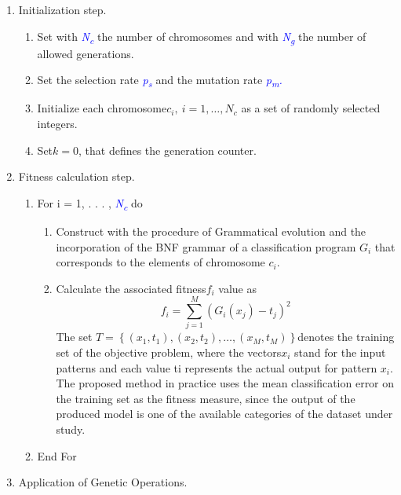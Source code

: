 \documentclass[12pt]{Definitions/academia}
\begin{document}
\begin{enumerate}
\item Initialization step.
\begin{enumerate}
\item Set with \textit{\textcolor{blue}{N\textsubscript{c}}} the number
of chromosomes and with \textit{\textcolor{blue}{N\textsubscript{g}}}
the number of allowed generations.
\item Set the selection rate \textit{\textcolor{blue}{p\textsubscript{s}
}}and the mutation rate \textit{\textcolor{blue}{p\textsubscript{m}.}}
\item Initialize each chromosome$c_{i},\ i=1,\ldots,N_{c}$ as a set of
randomly selected integers.
\item Set$k=0$, that defines the generation counter.
\end{enumerate}
\vspace{2em}
\item Fitness calculation step.
\begin{enumerate}
\item For i = 1, . . . , \textit{\textcolor{blue}{N\textsubscript{c}}}
do
\vspace{2em}
\begin{enumerate}
\item Construct with the procedure of Grammatical evolution and the incorporation
of the BNF grammar of  a classification
program $G_{i}$ that corresponds to the elements of chromosome $c_{i}$.
\item Calculate the associated fitness$f_{i}$ value as
\begin{equation}
f_{i}=\sum_{j=1}^{M}\left(G_{i}\left(x_{j}\right)-t_{j}\right)^{2}
\end{equation}
The set $T=\left\{ \left(x_{1},t_{1}\right),\left(x_{2},t_{2}\right),\ldots,\left(x_{M},t_{M}\right)\right\} $denotes
the training set of the objective problem, where the vectors$x_{i}$
stand for the input patterns and each value ti represents the actual
output for pattern $x_{i}$. The proposed method in practice uses
the mean classification error on the training set as the fitness measure,
since the output of the produced model is one of the available categories
of the dataset under study.
\end{enumerate}
\item End For
\end{enumerate}
\vspace{2em}
\item Application of Genetic Operations.

\end{enumerate}
\end{document}
